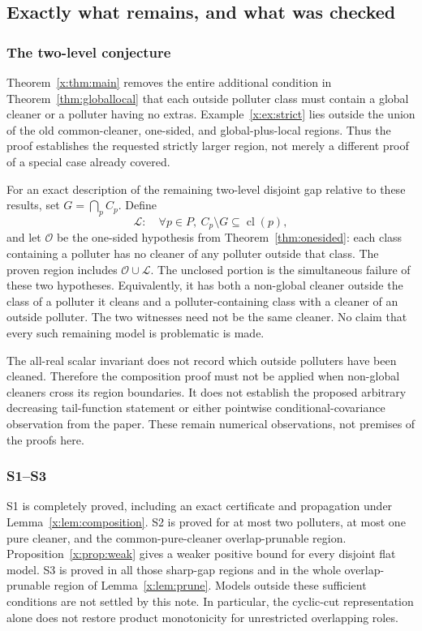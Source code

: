 \documentclass[11pt,a4paper]{article}
\theoremstyle{definition}\newtheorem{definition}[theorem]{Definition}
\theoremstyle{remark}\newtheorem{remark}[theorem]{Remark}
\theoremstyle{definition}\newtheorem{xexample}[xtheorem]{Example}\theoremstyle{plain}
\newcommand{\cl}{\operatorname{cl}}
\begin{document}
\subsection{Exactly what remains, and what was checked}

\subsubsection{The two-level conjecture}
Theorem~\ref{x:thm:main} removes the entire additional condition in Theorem~\ref{thm:globallocal} that each outside polluter class must contain a global cleaner or a polluter having no extras. Example~\ref{x:ex:strict} lies outside the union of the old common-cleaner, one-sided, and global-plus-local regions. Thus the proof establishes the requested strictly larger region, not merely a different proof of a special case already covered.

For an exact description of the remaining two-level disjoint gap relative to these results, set $G=\bigcap_p C_p$. Define
\[
\mathcal L:\quad \forall p\in P,\ C_p\setminus G\subseteq\cl(p),
\]
and let $\mathcal O$ be the one-sided hypothesis from Theorem~\ref{thm:onesided}: each class containing a polluter has no cleaner of any polluter outside that class. The proven region includes $\mathcal O\cup\mathcal L$. The unclosed portion is the simultaneous failure of these two hypotheses. Equivalently, it has both a non-global cleaner outside the class of a polluter it cleans and a polluter-containing class with a cleaner of an outside polluter. The two witnesses need not be the same cleaner. No claim that every such remaining model is problematic is made.

The all-real scalar invariant does not record which outside polluters have been cleaned. Therefore the composition proof must not be applied when non-global cleaners cross its region boundaries. It does not establish the proposed arbitrary decreasing tail-function statement or either pointwise conditional-covariance observation from the paper. These remain numerical observations, not premises of the proofs here.

\subsubsection{S1--S3}
S1 is completely proved, including an exact certificate and propagation under Lemma~\ref{x:lem:composition}. S2 is proved for at most two polluters, at most one pure cleaner, and the common-pure-cleaner overlap-prunable region. Proposition~\ref{x:prop:weak} gives a weaker positive bound for every disjoint flat model. S3 is proved in all those sharp-gap regions and in the whole overlap-prunable region of Lemma~\ref{x:lem:prune}. Models outside these sufficient conditions are not settled by this note. In particular, the cyclic-cut representation alone does not restore product monotonicity for unrestricted overlapping roles.
\end{document}

